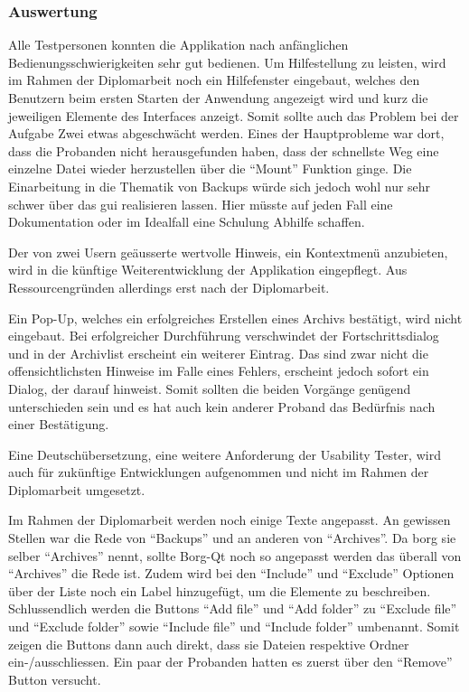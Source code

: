 \subsubsection{Auswertung}
\label{sec:org5ab75f4}

Alle Testpersonen konnten die Applikation nach anfänglichen
Bedienungsschwierigkeiten sehr gut bedienen. Um Hilfestellung zu leisten, wird
im Rahmen der Diplomarbeit noch ein Hilfefenster eingebaut, welches den
Benutzern beim ersten Starten der Anwendung angezeigt wird und kurz die
jeweiligen Elemente des Interfaces anzeigt. Somit sollte auch das Problem bei
der Aufgabe Zwei etwas abgeschwächt werden. Eines der Hauptprobleme war dort,
dass die Probanden nicht herausgefunden haben, dass der schnellste Weg eine
einzelne Datei wieder herzustellen über die "`Mount"' Funktion ginge. Die
Einarbeitung in die Thematik von Backups würde sich jedoch wohl nur sehr schwer
über das \gls{gui} realisieren lassen. Hier müsste auf jeden Fall eine
Dokumentation oder im Idealfall eine Schulung Abhilfe schaffen.

Der von zwei Usern geäusserte wertvolle Hinweis, ein Kontextmenü
anzubieten, wird in die künftige Weiterentwicklung der Applikation
eingepflegt. Aus Ressourcengründen allerdings erst nach der Diplomarbeit.

Ein Pop-Up, welches ein erfolgreiches Erstellen eines Archivs bestätigt, wird
nicht eingebaut. Bei erfolgreicher Durchführung verschwindet der
Fortschrittsdialog und in der Archivlist erscheint ein weiterer Eintrag. Das
sind zwar nicht die offensichtlichsten Hinweise im Falle eines Fehlers,
erscheint jedoch sofort ein Dialog, der darauf hinweist. Somit sollten die
beiden Vorgänge genügend unterschieden sein und es hat auch kein anderer Proband
das Bedürfnis nach einer Bestätigung.

Eine Deutschübersetzung, eine weitere Anforderung der Usability Tester, wird
auch für zukünftige Entwicklungen aufgenommen und nicht im Rahmen der
Diplomarbeit umgesetzt.

Im Rahmen der Diplomarbeit werden noch einige Texte angepasst. An gewissen
Stellen war die Rede von "`Backups"' und an anderen von "`Archives"'. Da \gls{borg}
sie selber "`Archives"' nennt, sollte Borg-Qt noch so angepasst werden das
überall von "`Archives"' die Rede ist. Zudem wird bei den "`Include"' und "`Exclude"'
Optionen über der Liste noch ein Label hinzugefügt, um die Elemente zu
beschreiben. Schlussendlich werden die Buttons "`Add file"' und "`Add folder"' zu
"`Exclude file"' und "`Exclude folder"' sowie "`Include file"' und "`Include folder"'
umbenannt. Somit zeigen die Buttons dann auch direkt, dass sie Dateien
respektive Ordner ein-/ausschliessen. Ein paar der Probanden hatten es zuerst
über den "`Remove"' Button versucht.

